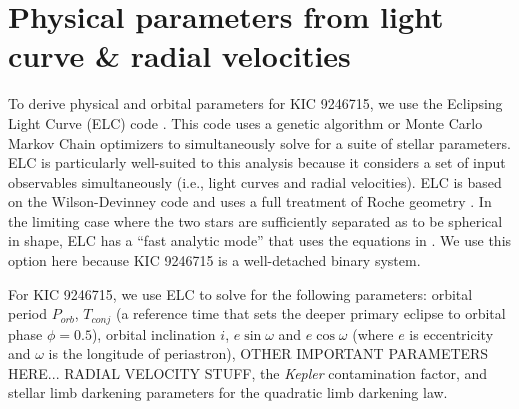 \section{Physical parameters from light curve \& radial velocities}\label{model}
To derive physical and orbital parameters for KIC 9246715, we use the Eclipsing Light Curve (ELC) code \citep{oro00}. This code uses a genetic algorithm or Monte Carlo Markov Chain optimizers to simultaneously solve for a suite of stellar parameters. ELC is particularly well-suited to this analysis because it considers a set of input observables simultaneously (i.e., light curves and radial velocities). ELC is based on the Wilson-Devinney code \citep{wil71} and uses a full treatment of Roche geometry \citep{Avni_1975}. In the limiting case where the two stars are sufficiently separated as to be spherical in shape, ELC has a ``fast analytic mode'' that uses the equations in \citep{gim06}. We use this option here because KIC 9246715 is a well-detached binary system.

For KIC 9246715, we use ELC to solve for the following parameters: orbital period $P_{orb}$, $T_{conj}$ (a reference time that sets the deeper primary eclipse to orbital phase $\phi = 0.5$), orbital inclination $i$, $e \sin \omega$ and $e \cos \omega$ (where $e$ is eccentricity and $\omega$ is the longitude of periastron), OTHER IMPORTANT PARAMETERS HERE... RADIAL VELOCITY STUFF, the \emph{Kepler} contamination factor, and stellar limb darkening parameters for the quadratic limb darkening law.


%
